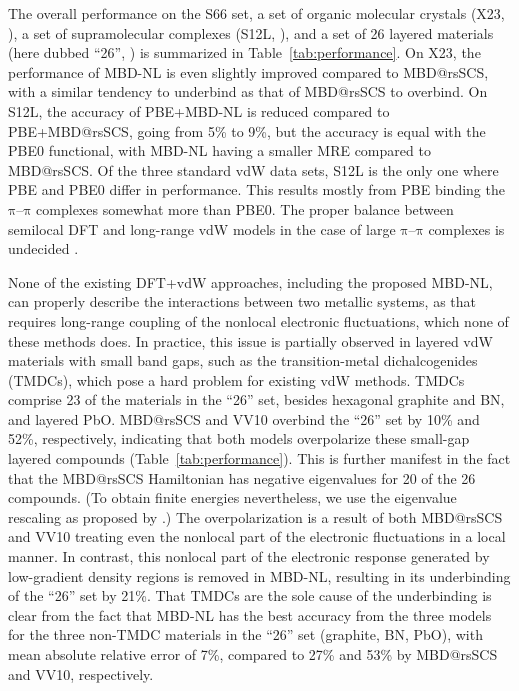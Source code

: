 The overall performance on the S66 set, a set of organic molecular crystals (X23, \citealp{ReillyJCP13}), a set of supramolecular complexes (S12L, \citealp{GrimmeCEJ12}), and a set of 26 layered materials (here dubbed ``26'', \citealp{BjorkmanPRB12}) is summarized in Table~\ref{tab:performance}.
On X23, the performance of MBD-NL is even slightly improved compared to MBD@rsSCS, with a similar tendency to underbind as that of MBD@rsSCS to overbind.
On S12L, the accuracy of PBE+MBD-NL is reduced compared to PBE+MBD@rsSCS, going from 5\% to 9\%, but the accuracy is equal with the PBE0 functional, with MBD-NL having a smaller MRE compared to MBD@rsSCS\@.
Of the three standard vdW data sets, S12L is the only one where PBE and PBE0 differ in performance.
This results mostly from PBE binding the $\mathrm\pi$--$\mathrm\pi$ complexes somewhat more than PBE0.
The proper balance between semilocal DFT and long-range vdW models in the case of large $\mathrm\pi$--$\mathrm\pi$ complexes is undecided \citep{HermannJCTC18}.

None of the existing DFT+vdW approaches, including the proposed MBD-NL, can properly describe the interactions between two metallic systems, as that requires long-range coupling of the nonlocal electronic fluctuations, which none of these methods does.
In practice, this issue is partially observed in layered vdW materials with small band gaps, such as the transition-metal dichalcogenides (TMDCs), which pose a hard problem for existing vdW methods.
TMDCs comprise 23 of the materials in the ``26'' set, besides hexagonal graphite and BN, and layered PbO.
MBD@rsSCS and VV10 overbind the ``26'' set by 10\% and 52\%, respectively, indicating that both models overpolarize these small-gap layered compounds (Table~\ref{tab:performance}).
This is further manifest in the fact that the MBD@rsSCS Hamiltonian has negative eigenvalues for 20 of the 26 compounds.
(To obtain finite energies nevertheless, we use the eigenvalue rescaling as proposed by \citet{GouldJCTC16a}.)
The overpolarization is a result of both MBD@rsSCS and VV10 treating even the nonlocal part of the electronic fluctuations in a local manner.
In contrast, this nonlocal part of the electronic response generated by low-gradient density regions is removed in MBD-NL, resulting in its underbinding of the ``26'' set by 21\%.
That TMDCs are the sole cause of the underbinding is clear from the fact that MBD-NL has the best accuracy from the three models for the three non-TMDC materials in the ``26'' set (graphite, BN, PbO), with mean absolute relative error of 7\%, compared to 27\% and 53\% by MBD@rsSCS and VV10, respectively.

